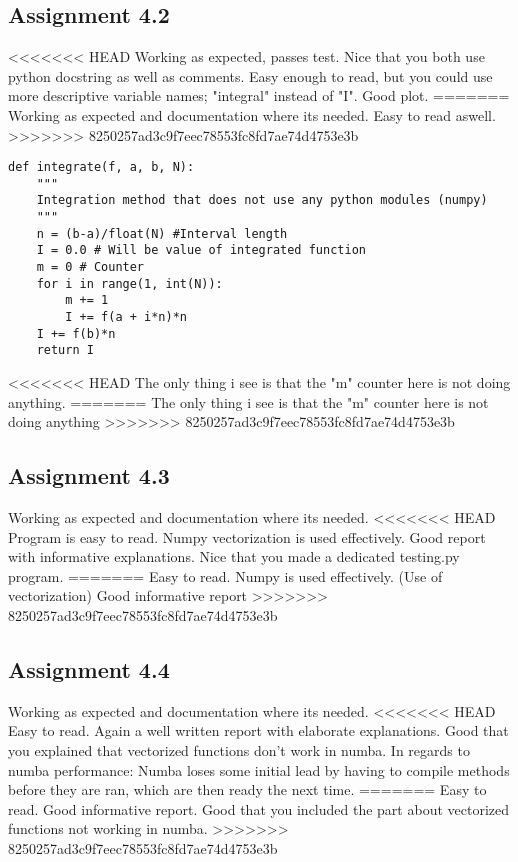 \documentclass[a4paper]{article}
\begin{document}
\subsection*{Assignment 4.2} \label{sec:assignment5.2}

<<<<<<< HEAD
Working as expected, passes test. Nice that you both use python docstring as well as comments.
Easy enough to read, but you could use more descriptive variable names; "integral" instead of "I". Good plot.
=======
Working as expected and documentation where its needed.
Easy to read aswell.
>>>>>>> 8250257ad3c9f7eec78553fc8fd7ae74d4753e3b

\begin{verbatim}
def integrate(f, a, b, N):
    """
    Integration method that does not use any python modules (numpy)
    """
    n = (b-a)/float(N) #Interval length
    I = 0.0 # Will be value of integrated function
    m = 0 # Counter
    for i in range(1, int(N)):
        m += 1
        I += f(a + i*n)*n
    I += f(b)*n
    return I
\end{verbatim}

<<<<<<< HEAD
The only thing i see is that the "m" counter here is not doing anything.
=======
The only thing i see is that the "m" counter here is not doing anything
>>>>>>> 8250257ad3c9f7eec78553fc8fd7ae74d4753e3b


\subsection*{Assignment 4.3}

Working as expected and documentation where its needed.
<<<<<<< HEAD
Program is easy to read.
Numpy vectorization is used effectively.
Good report with informative explanations.
Nice that you made a dedicated testing.py program.
=======
Easy to read.
Numpy is used effectively. (Use of vectorization)
Good informative report
>>>>>>> 8250257ad3c9f7eec78553fc8fd7ae74d4753e3b

\subsection*{Assignment 4.4}

Working as expected and documentation where its needed.
<<<<<<< HEAD
Easy to read. Again a well written report with elaborate explanations. Good that you explained that vectorized functions don't work in numba. In regards to numba performance: Numba loses some initial lead by having to compile methods before they are ran, which are then ready the next time.
=======
Easy to read. Good informative report. Good that you included the part about vectorized functions not working in numba.
>>>>>>> 8250257ad3c9f7eec78553fc8fd7ae74d4753e3b
\end{document}
